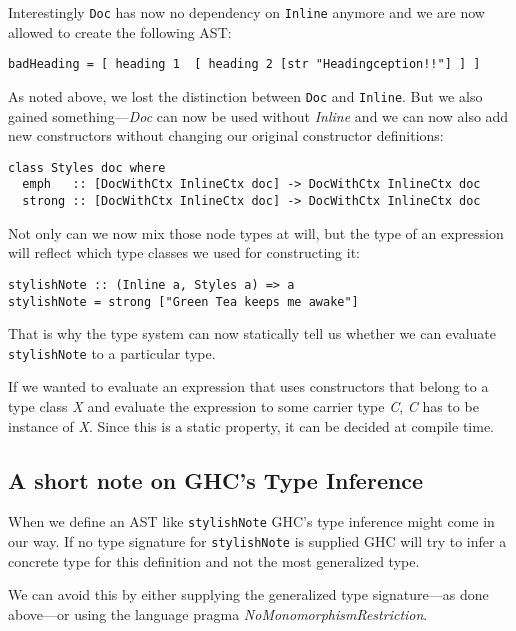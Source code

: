 Interestingly \texttt{Doc} has now no dependency on \texttt{Inline} anymore and
we are now allowed to create the following AST:

\begin{lstlisting}
badHeading = [ heading 1  [ heading 2 [str "Headingception!!"] ] ]
\end{lstlisting}

\clearpage

As noted above, we lost the distinction between \texttt{Doc} and
\texttt{Inline}. But we also gained something—\emph{Doc} can now be used
without \emph{Inline} and we can now also add new constructors without changing our
original constructor definitions:

\begin{lstlisting}
class Styles doc where
  emph   :: [DocWithCtx InlineCtx doc] -> DocWithCtx InlineCtx doc
  strong :: [DocWithCtx InlineCtx doc] -> DocWithCtx InlineCtx doc
\end{lstlisting}

Not only can we now mix those node types at will, but the type of an expression
will reflect which type classes we used for constructing it:

\begin{lstlisting}
stylishNote :: (Inline a, Styles a) => a
stylishNote = strong ["Green Tea keeps me awake"]
\end{lstlisting}

That is why the type system can now statically tell us whether we can evaluate
\texttt{stylishNote} to a particular type.

If we wanted to evaluate an expression that uses constructors that belong to a
type class \emph{X} and evaluate the expression to some carrier type \emph{C},
\emph{C} has to be instance of \emph{X}. Since this is a static property, it can
be decided at compile time.

\subsection{A short note on GHC’s Type Inference}

When we define an AST like \texttt{stylishNote} GHC’s type inference might come
in our way. If no type signature for \texttt{stylishNote} is supplied GHC will
try to infer a concrete type for this definition and not the most generalized
type.

We can avoid this by either supplying the generalized type signature—as done
above—or using the language pragma \emph{NoMonomorphismRestriction}.


